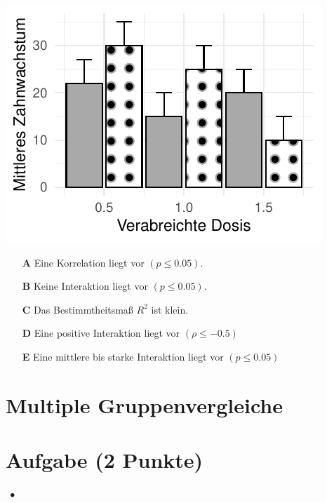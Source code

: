 \documentclass[a4paper, 9pt]{scrartcl}\usepackage[]{graphicx}\usepackage[]{xcolor}
\makeatletter
\def\maxwidth{ %
  \ifdim\Gin@nat@width>\linewidth
    \linewidth
  \else
    \Gin@nat@width
  \fi
}
\makeatother
\begin{document}
{\centering \includegraphics[width=\maxwidth]{img/mc-anova-02-a-1} 

}







\begin{enumerate}
\item [\textbf{A} \msquare] Eine Korrelation liegt vor $(p \leq 0.05)$.
\item [\textbf{B} \msquare] Keine Interaktion liegt vor $(p \leq 0.05)$.
\item [\textbf{C} \msquare] Das Bestimmtheitsmaß $R^2$ ist klein.
\item [\textbf{D} \msquare] Eine positive Interaktion liegt vor $(\rho \leq -0.5)$ 
\item [\textbf{E} \msquare] Eine mittlere bis starke Interaktion liegt vor $(p \leq 0.05)$
\end{enumerate}
\section*{Multiple Gruppenvergleiche} 

\section{Aufgabe \hfill (2 Punkte)}

\ifcollection
\begin{flushright}
\tiny\vspace{-2Ex}
\textbf{\examinhaltstart}
\exammodulestatversuch $\;\bullet$
\exammodulebiostat
\vspace{-1Ex}
\end{flushright}
\fi
\end{document}
